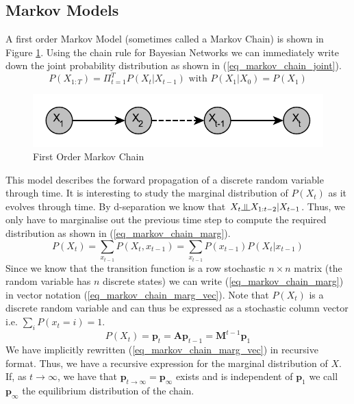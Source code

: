\documentclass[../masters.tex]{subfiles}
\begin{document}
\subsection{Markov Models}
A first order Markov Model (sometimes called a Markov Chain) is shown in Figure \ref{fig_markov_chain}. Using the chain rule for Bayesian Networks we can immediately write down the joint probability distribution as shown in (\ref{eq_markov_chain_joint}).
\begin{equation}
P(X_{1:T}) = \Pi_{t=1}^T P(X_t|X_{t-1}) \text{ with } P(X_1|X_{0}) = P(X_1)
\label{eq_markov_chain_joint}
\end{equation}  
\begin{figure}[H] 
\centering
\includegraphics[scale=1.0]{markov_chain.pdf}
\caption{First Order Markov Chain}
\label{fig_markov_chain}
\end{figure}
This model describes the forward propagation of a discrete random variable through time. It is interesting to study the marginal distribution of $P(X_t)$ as it evolves through time. By d-separation we know that $X_t \indep X_{1:t-2} | X_{t-1}$. Thus, we only have to marginalise out the previous time step to compute the required distribution as shown in (\ref{eq_markov_chain_marg}).
\begin{equation}
P(X_t) = \sum_{x_{t-1}} P(X_t, x_{t-1}) = \sum_{x_{t-1}} P(x_{t-1})P(X_t|x_{t-1})
\label{eq_markov_chain_marg}
\end{equation}
Since we know that the transition function is a row stochastic $n \times n$ matrix (the random variable has $n$ discrete states) we can write (\ref{eq_markov_chain_marg}) in vector notation (\ref{eq_markov_chain_marg_vec}). Note that $P(X_t)$ is a discrete random variable and can thus be expressed as a stochastic column vector i.e. $\sum_i P(x_t=i) = 1$.
\begin{equation}
P(X_t) = \mathbf{p}_t = \mathbf{A}\mathbf{p}_{t-1} = \mathbf{M}^{t-1}\mathbf{p}_1
\label{eq_markov_chain_marg_vec}
\end{equation}
We have implicitly rewritten (\ref{eq_markov_chain_marg_vec}) in recursive format. Thus, we have a recursive expression for the marginal distribution of $X$. If, as $t \rightarrow \infty$, we have that $\mathbf{p}_{t \rightarrow \infty} = \mathbf{p}_{\infty}$ exists and is independent of $\mathbf{p}_1$ we call $\mathbf{p}_{\infty}$ the equilibrium distribution of the chain. 
\end{document}
